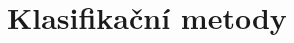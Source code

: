 \documentclass[czech,DP]{thesiskiv}
\begin{document}





\chapter{Klasifikační metody}







 
% 
%

{\raggedright\small

}
\end{document}
